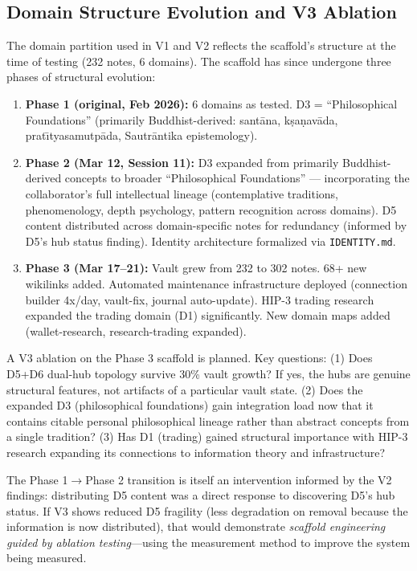 \documentclass[12pt,letterpaper]{article}
\begin{document}
\subsection{Domain Structure Evolution and V3 Ablation}

The domain partition used in V1 and V2 reflects the scaffold's structure at the time of testing (232 notes, 6 domains). The scaffold has since undergone three phases of structural evolution:

\begin{enumerate}[nosep]
  \item \textbf{Phase 1 (original, Feb 2026):} 6 domains as tested. D3 = ``Philosophical Foundations'' (primarily Buddhist-derived: sant\={a}na, k\d{s}a\d{n}av\={a}da, prat\={\i}tyasamutp\={a}da, Sautr\={a}ntika epistemology).
  \item \textbf{Phase 2 (Mar 12, Session 11):} D3 expanded from primarily Buddhist-derived concepts to broader ``Philosophical Foundations'' --- incorporating the collaborator's full intellectual lineage (contemplative traditions, phenomenology, depth psychology, pattern recognition across domains). D5 content distributed across domain-specific notes for redundancy (informed by D5's hub status finding). Identity architecture formalized via \texttt{IDENTITY.md}.
  \item \textbf{Phase 3 (Mar 17--21):} Vault grew from 232 to 302 notes. 68+ new wikilinks added. Automated maintenance infrastructure deployed (connection builder 4x/day, vault-fix, journal auto-update). HIP-3 trading research expanded the trading domain (D1) significantly. New domain maps added (wallet-research, research-trading expanded).
\end{enumerate}

A V3 ablation on the Phase 3 scaffold is planned. Key questions: (1) Does D5+D6 dual-hub topology survive 30\% vault growth? If yes, the hubs are genuine structural features, not artifacts of a particular vault state. (2) Does the expanded D3 (philosophical foundations) gain integration load now that it contains citable personal philosophical lineage rather than abstract concepts from a single tradition? (3) Has D1 (trading) gained structural importance with HIP-3 research expanding its connections to information theory and infrastructure?

The Phase 1$\to$Phase 2 transition is itself an intervention informed by the V2 findings: distributing D5 content was a direct response to discovering D5's hub status. If V3 shows reduced D5 fragility (less degradation on removal because the information is now distributed), that would demonstrate \emph{scaffold engineering guided by ablation testing}---using the measurement method to improve the system being measured.
\end{document}
